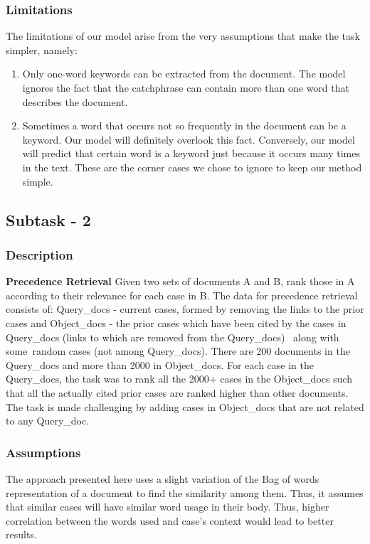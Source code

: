\subsubsection{Limitations}
The limitations of our model arise from the very assumptions that make the task simpler, namely:
\begin{enumerate}
	\item Only one-word keywords can be extracted from the document. The model ignores the fact that the catchphrase can contain more than one word that describes the document.
	\item Sometimes a word that occurs not so frequently in the document can be a keyword. Our model will definitely overlook this fact. Conversely, our model will predict that certain word is a keyword just because it occurs many times in the text. These are the corner cases we chose to ignore to keep our method simple.
\end{enumerate}


\subsection{Subtask - 2}
\subsubsection{Description}
\textbf{Precedence Retrieval} Given two sets of documents A and B, rank those in A according to their relevance for each case in B. The data for precedence retrieval consists of: Query\_docs - current cases, formed by removing the links to the prior cases and Object\_docs - the prior cases which have been cited by the cases in Query\_docs (links to which are removed from the Query\_docs)  along with some random cases (not among Query\_docs). There are 200 documents in the Query\_docs and more than 2000 in Object\_docs. For each case in the Query\_docs, the task was to rank all the 2000+ cases in the Object\_docs such that all the actually cited prior cases are ranked higher than other documents. The task is made challenging by adding cases in Object\_docs that are not related to any Query\_doc.

\subsubsection{Assumptions}
The approach presented here uses a slight variation of the Bag of words representation of a document to find the similarity among them. Thus, it assumes that similar cases will have similar word usage in their body. Thus, higher correlation between the words used and case's context would lead to better results.
